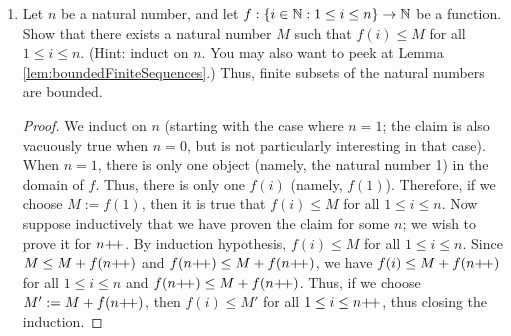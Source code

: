 \documentclass[../main.tex]{subfiles}
\begin{document}
\begin{enumerate}[ref={\thesection.\arabic*}]
    \begin{proof}
        We first need a lemma.
        \begin{lem}\label{lem:naturalsEmptyset}
            There exists no natural number $i$ satisfying $1\leq i\leq 0$.
            \begin{proof}
                Suppose for the sake of contradiction that there exists some natural number $i$ satisfying $1\leq i\leq 0$. Since $i\leq 0$ by hypothesis but $i\geq 0$ by Exercise \ref{exr:2.2.4a}, Exercise \ref{exr:2.2.3c} implies that $i=0$. However, we also have $i\geq 1$, which implies that $i>0$ by Exercise \ref{exr:2.2.3e}, and that $i\neq 0$ by Definition \ref{dfn:ordering}, a contradiction. Therefore, no natural number $i$ satisfies $1\leq i\leq 0$.
            \end{proof}
        \end{lem}
        Now for the primary proof. Suppose first that $X$ has cardinality 0. Then by Definition \ref{dfn:cardinalityN}, there exists a bijection $f:\{i\in\N:1\leq i\leq 0\}\to X$. Since there is no natural number $i$ (i.e., no element of $\N$) satisfying $1\leq i\leq 0$ (Lemma \ref{lem:naturalsEmptyset}), $\{i\in\N:1\leq i\leq 0\}=\emptyset$. Thus, the bijection $f$ maps $\emptyset$ to $X$. But since $f$ is an empty function and a bijection, Exercise \ref{exr:3.3.3} asserts that the range of $f$ is the empty set, i.e., $X=\emptyset$. Now suppose that $X$ is the empty set. Then for $f:X\to\{i\in\N:1\leq i\leq n\}$ to be a bijection, we must have $\{i\in\N:1\leq i\leq n\}=\emptyset$ (Exercise \ref{exr:3.3.3} again). As previously established, this happens when $n=0$ (note that we need not rule out this happening for all other $n$ since we have Proposition \ref{prp:cardinalityUniqueness}). Thus, by Definition \ref{dfn:cardinalityN}, $\#(X)=0$.
    \end{proof}
    \item \label{exr:3.6.3}Let $n$ be a natural number, and let $f:\{i\in\mathbb{N}:1\leq i\leq n\}\to\mathbb{N}$ be a function. Show that there exists a natural number $M$ such that $f(i)\leq M$ for all $1\leq i\leq n$. (Hint: induct on $n$. You may also want to peek at Lemma \ref{lem:boundedFiniteSequences}.) Thus, finite subsets of the natural numbers are bounded.
    \begin{proof}
        We induct on $n$ (starting with the case where $n=1$; the claim is also vacuously true when $n=0$, but is not particularly interesting in that case). When $n=1$, there is only one object (namely, the natural number 1) in the domain of $f$. Thus, there is only one $f(i)$ (namely, $f(1)$). Therefore, if we choose $M:=f(1)$, then it is true that $f(i)\leq M$ for all $1\leq i\leq n$. Now suppose inductively that we have proven the claim for some $n$; we wish to prove it for $n{+\!+}$. By induction hypothesis, $f(i)\leq M$ for all $1\leq i\leq n$. Since $M\leq M+f(n{+\!+})$ and $f(n{+\!+})\leq M+f(n{+\!+})$, we have $f(i)\leq M+f(n{+\!+})$ for all $1\leq i\leq n$ and $f(n{+\!+})\leq M+f(n{+\!+})$. Thus, if we choose $M':=M+f(n{+\!+})$, then $f(i)\leq M'$ for all $1\leq i\leq n{+\!+}$, thus closing the induction.

\end{proof}
\end{enumerate}
\end{document}
